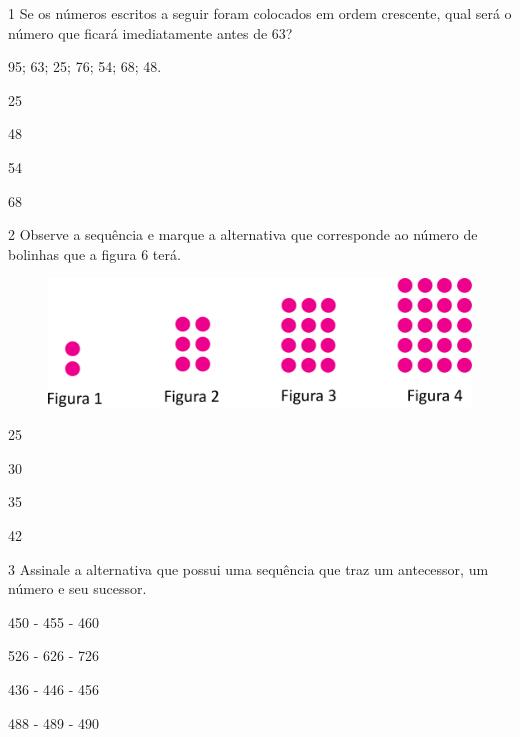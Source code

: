 \pagebreak
{}

\num{1} Se os números escritos a seguir foram colocados em ordem crescente, qual
será o número que ficará imediatamente antes de 63?

\begin{myquote}
95; 63; 25; 76; 54; 68; 48.
\end{myquote}

\begin{escolha}

\item
  25
\item
  48
\item
  54
\item
  68
\end{escolha}


\num{2} Observe a sequência e marque a alternativa que corresponde ao número de bolinhas que a figura 6 terá.

\begin{figure}[htpb!]
\includegraphics[width=\textwidth]{./media/image37.png}
\end{figure}

\begin{escolha}
\item
  25
\item
  30
\item
  35
\item
  42
\end{escolha}

\pagebreak
\num{3} Assinale a alternativa que possui uma sequência que traz um antecessor, um número e seu sucessor.

\begin{escolha}
\item 450 - 455 - 460

\item 526 - 626 - 726

\item 436 - 446 - 456

\item 488 - 489 - 490
\end{escolha}

